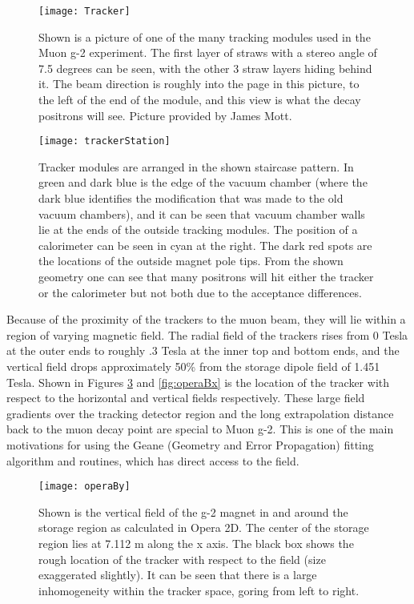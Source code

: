 \begin{figure}[]
\caption{Shown is a picture of one of the many tracking modules used in the Muon g-2 experiment. The first layer of straws with a stereo angle of 7.5 degrees can be seen, with the other 3 straw layers hiding behind it. The beam direction is roughly into the page in this picture, to the left of the end of the module, and this view is what the decay positrons will see. Picture provided by James Mott.}
\centering
\texttt{[image: Tracker]}
\label{fig:tracker}
\end{figure}

\begin{figure}[]
\caption{Tracker modules are arranged in the shown staircase pattern. In green and dark blue is the edge of the vacuum chamber (where the dark blue identifies the modification that was made to the old vacuum chambers), and it can be seen that vacuum chamber walls lie at the ends of the outside tracking modules. The position of a calorimeter can be seen in cyan at the right. The dark red spots are the locations of the outside magnet pole tips. From the shown geometry one can see that many positrons will hit either the tracker or the calorimeter but not both due to the acceptance differences.}
\centering
\texttt{[image: trackerStation]}
\label{fig:staircase}
\end{figure}


  Because of the proximity of the trackers to the muon beam, they will lie within a region of varying magnetic field. The radial field of the trackers rises from 0 Tesla at the outer ends to roughly .3 Tesla at the inner top and bottom ends, and the vertical field drops approximately 50\% from the storage dipole field of 1.451 Tesla. Shown in Figures \ref{fig:operaBy} and \ref{fig:operaBx} is the location of the tracker with respect to the horizontal and vertical fields respectively. These large field gradients over the tracking detector region and the long extrapolation distance back to the muon decay point are special to Muon g-2. This is one of the main motivations for using the Geane (Geometry and Error Propagation) fitting algorithm and routines, which has direct access to the field. 


\begin{figure}[]
\caption{Shown is the vertical field of the g-2 magnet in and around the storage region as calculated in Opera 2D. The center of the storage region lies at 7.112 m along the x axis. The black box shows the rough location of the tracker with respect to the field (size exaggerated slightly). It can be seen that there is a large inhomogeneity within the tracker space, goring from left to right.}
\centering
\texttt{[image: operaBy]}
\label{fig:operaBy}
\end{figure}

